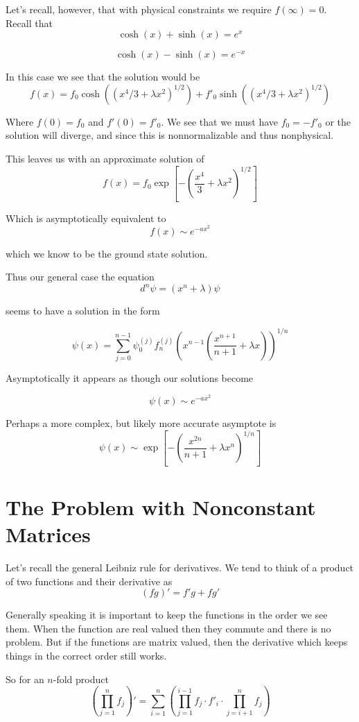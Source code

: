 \documentclass{amsart}
\theoremstyle{definition}
\theoremstyle{remark}
\numberwithin{equation}{section}
\begin{document}
Let's recall, however, that with physical constraints we require $f(\infty) = 0$.  Recall that 
\[
\cosh(x) + \sinh(x) = e^x
\]

\[
\cosh(x)-\sinh(x) = e^{-x}
\]

In this case we see that the solution would be
\[
f(x) = f_0 \cosh((x^4/3+\lambda x^2)^{1/2}) + f'_0  \sinh((x^4/3+\lambda x^2)^{1/2})
\]

Where $f(0)=f_0$ and $f'(0)=f'_0$.  We see that we must have $f_0 = - f'_0$ or the solution will diverge, and since this is nonnormalizable and thus nonphysical.

This leaves us with an approximate solution of
\[
f(x) = f_0 \exp\left[-(\frac{x^4}{3}+\lambda x^2)^{1/2} \right]
\]

Which is asymptotically equivalent to
\[
f(x) \sim e^{-ax^2}
\]

which we know to be the ground state solution.


Thus our general case the equation
\[
d^n \psi = (x^n + \lambda)\psi
\]

seems to have a solution in the form

\[
\psi(x) = \sum_{j=0}^{n-1} \psi^{(j)}_0 f^{(j)}_n(x^{n-1}(\frac{x^{n+1}}{n+1}+\lambda x))^{1/n} 
\]

Asymptotically it appears as though our solutions become

\[
\psi(x) \sim e^{-ax^2}
\]

Perhaps a more complex, but likely more accurate asymptote is
\[
\psi(x) \sim \exp\left[-\left(\frac{x^{2n}}{n+1}+\lambda x^n\right)^{1/n}\right]
\]


\section{The Problem with Nonconstant Matrices}


Let's recall the general Leibniz rule for derivatives.  We tend to think of a product of two functions and their derivative as
\[
(fg)' = f'g+fg'
\]

Generally speaking it is important to keep the functions in the order we see them.  When the function are real valued then they commute and there is no problem.  But if the functions are matrix valued, then the derivative which keeps things in the correct order still works.

So for an $n$-fold product
\[
(\prod_{j=1}^{n} f_j)' = \sum_{i=1}^{n}\left(\prod_{j=1}^{i-1}f_j \cdot f'_{i} \cdot \prod_{j=i+1}^{n}f_j\right)
\]
\end{document}
